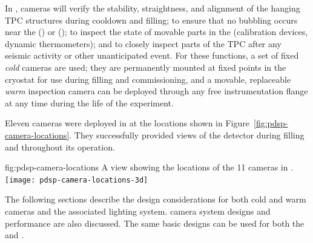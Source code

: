 In , cameras will verify the stability, straightness,
and alignment of the hanging TPC structures during cooldown and
filling; to ensure that no bubbling occurs near the 
(\single) or  (\dual); to inspect the
state of movable parts in the  (calibration devices, dynamic
thermometers); and to closely inspect parts of the TPC after any seismic activity or other unanticipated
event.  For these functions, a set of fixed
\textit{cold} cameras are used; they are permanently mounted at fixed points in the cryostat
for use during filling and commissioning, and a movable, replaceable
\textit{warm} inspection camera can be deployed through any free
instrumentation flange at any time during the life of the
experiment. 

Eleven cameras were deployed in  at the locations shown in Figure~\ref{fig:pdsp-camera-locations}. They successfully provided views of the detector during filling and throughout %
its operation. %

\begin{dunefigure}{fig:pdsp-camera-locations}
  {A \threed view showing the locations of the 11 cameras in .}
  \texttt{[image: pdsp-camera-locations-3d]}%
\end{dunefigure}

The following sections describe the design considerations for both cold
and warm cameras and the associated lighting system.  camera system designs and performance are also discussed.  
The same basic
designs can be used for both the \single and \dual {}.

